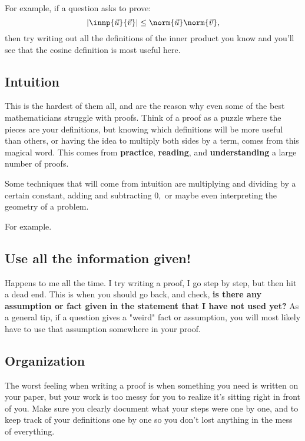 For example, if a question asks to prove:
$$|\innp{\vec{u}}{\vec{v}}| \leq \norm{\vec{u}} \norm{\vec{v}},$$ 
then try writing out all the definitions of the inner product you know and you'll see that the cosine definition is most useful here.

\subsection{Intuition}
This is the hardest of them all, and are the reason why even some of the best mathematicians struggle with proofs.
Think of a proof as a puzzle where the pieces are your definitions, but knowing which definitions will be more useful than others, or having the idea to multiply both sides by a term, comes from this magical word. 
This comes from \textbf{practice}, \textbf{reading}, and \textbf{understanding} a large number of proofs.

Some techniques that will come from intuition are multiplying and dividing by a certain constant, adding and subtracting $0,$ or maybe even interpreting the geometry of a problem.

For example.

\subsection{Use all the information given!}
Happens to me all the time. I try writing a proof, I go step by step, but then hit a dead end. 
This is when you should go back, and check, \textbf{is there any assumption or fact given in the statement that I have not used yet?}
As a general tip, if a question gives a "weird" fact or assumption, you will most likely have to use that assumption somewhere in your proof.

\subsection{Organization}
The worst feeling when writing a proof is when something you need is written on your paper, but your work is too messy for you to realize it's sitting right in front of you. 
Make sure you clearly document what your steps were one by one, and to keep track of your definitions one by one so you don't lost anything in the mess of everything.

